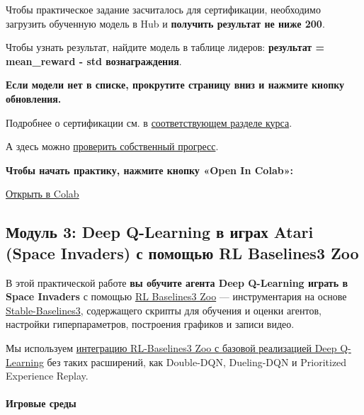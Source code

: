 \documentclass[11pt,a4paper]{article}
\begin{document}
Чтобы практическое задание засчиталось для сертификации, необходимо загрузить обученную модель в Hub и \textbf{получить результат не ниже 200}.

Чтобы узнать результат, найдите модель в таблице лидеров: \textbf{результат = mean\_reward - std вознаграждения}.

\textbf{Если модели нет в списке, прокрутите страницу вниз и нажмите кнопку обновления.}

Подробнее о сертификации см. в \href{https://huggingface.co/deep-rl-course/en/unit0/introduction#certification-process}{соответствующем разделе курса}.

А здесь можно \href{https://huggingface.co/spaces/ThomasSimonini/Check-my-progress-Deep-RL-Course}{проверить собственный прогресс}.

\textbf{Чтобы начать практику, нажмите кнопку «Open In Colab»:}

\href{https://colab.research.google.com/github/huggingface/deep-rl-class/blob/master/notebooks/unit3/unit3.ipynb}{Открыть в Colab}

\subsection{Модуль 3: Deep Q-Learning в играх Atari (Space Invaders) с помощью RL Baselines3 Zoo}\label{unit-3-deep-q-learning-with-atari-games-space-invaders-using-rl-baselines3-zoo}


В этой практической работе \textbf{вы обучите агента Deep Q-Learning играть в Space Invaders} с помощью \href{https://github.com/DLR-RM/rl-baselines3-zoo}{RL Baselines3 Zoo} --- инструментария на основе \href{https://stable-baselines3.readthedocs.io/en/master/}{Stable-Baselines3}, содержащего скрипты для обучения и оценки агентов, настройки гиперпараметров, построения графиков и записи видео.

Мы используем \href{https://stable-baselines3.readthedocs.io/en/master/modules/dqn.html}{интеграцию RL-Baselines3 Zoo с базовой реализацией Deep Q-Learning} без таких расширений, как Double-DQN, Dueling-DQN и Prioritized Experience Replay.

\paragraph{Игровые среды}\label{game-environments}
\end{document}
